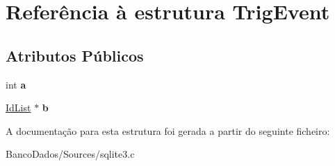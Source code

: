 \hypertarget{struct_trig_event}{\section{Referência à estrutura Trig\-Event}
\label{struct_trig_event}
}
\subsection*{Atributos Públicos}
\begin{DoxyCompactItemize}
\item 
\hypertarget{struct_trig_event_a19ac5a5e59e08350f72ec49cf8fccbb6}{int {\bfseries a}}\label{struct_trig_event_a19ac5a5e59e08350f72ec49cf8fccbb6}

\item 
\hypertarget{struct_trig_event_a86ef160cde95382e98b7934614e7f79f}{\hyperlink{struct_id_list}{Id\-List} $\ast$ {\bfseries b}}\label{struct_trig_event_a86ef160cde95382e98b7934614e7f79f}

\end{DoxyCompactItemize}


A documentação para esta estrutura foi gerada a partir do seguinte ficheiro\-:\begin{DoxyCompactItemize}
\item 
Banco\-Dados/\-Sources/sqlite3.\-c\end{DoxyCompactItemize}
